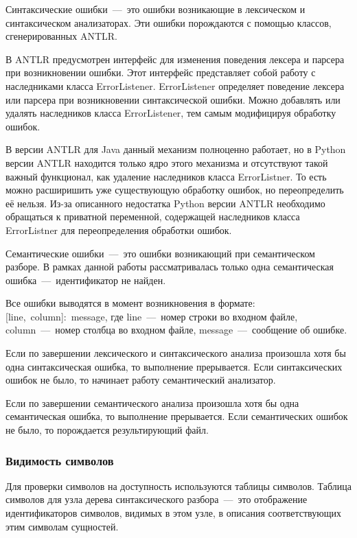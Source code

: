 \documentclass[12pt,a4paper,oneside]{extarticle}
\begin{document}
            Синтаксические ошибки~---~это ошибки возникающие в лексическом и синтаксическом анализаторах.
            Эти ошибки порождаются с помощью классов, сгенерированных ANTLR.

            В ANTLR предусмотрен интерфейс для изменения поведения лексера и парсера при возникновении ошибки.
            Этот интерфейс представляет собой работу с наследниками класса ErrorListener.
            ErrorListener определяет поведение лексера или парсера при возникновении синтаксической ошибки.
            Можно добавлять или удалять наследников класса ErrorListener, тем самым модифицируя обработку ошибок.

            В версии ANTLR для Java данный механизм полноценно работает, но в Python версии ANTLR находится только ядро этого механизма и отсутствуют такой важный функционал, как удаление наследников класса ErrorListner.
            То есть можно расширишить уже существующую обработку ошибок, но переопределить её нельзя.
            Из-за описанного недостатка Python версии ANTLR необходимо обращаться к приватной переменной, содержащей наследников класса ErrorListner для переопределения обработки ошибок.

            Семантические ошибки~---~это ошибки возникающий при семантическом разборе. В рамках данной работы рассматривалась только одна семантическая ошибка~---~идентификатор не найден.

            Все ошибки выводятся в момент возникновения в формате: [line,~column]:~message, где line~---~номер строки во входном файле, column~---~номер столбца во входном файле, message~---~сообщение об ошибке.

            Если по завершении лексического и синтаксического анализа произошла хотя бы одна синтаксическая ошибка, то выполнение прерывается. Если синтаксических ошибок не было, то начинает работу семантический анализатор. 

            Если по завершении семантического анализа произошла хотя бы одна семантическая ошибка, то выполнение прерывается. Если семантических ошибок не было, то порождается результирующий файл.

        \subsubsection{Видимость символов}
            Для проверки символов на доступность используются таблицы символов.
            Таблица символов для узла дерева синтаксического разбора~---~это отображение идентификаторов символов, видимых в этом узле, в описания соответствующих этим символам сущностей.
\end{document}

